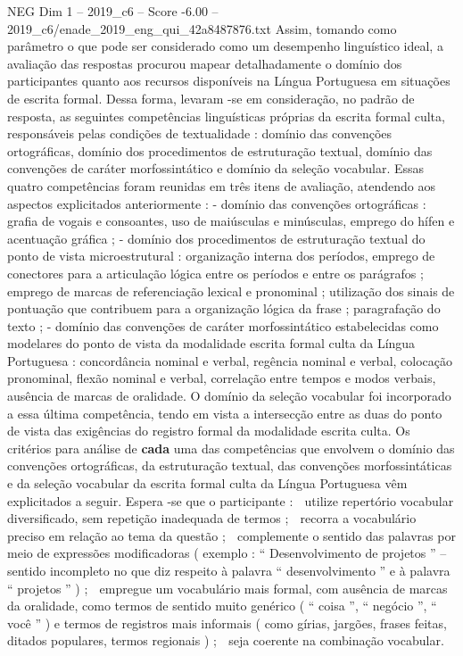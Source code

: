 \begin{textsample}{NEG Dim 1 – 2019\_c6 – Score -6.00 – 2019\_c6/enade\_2019\_eng\_qui\_42a8487876.txt}
Assim, tomando como parâmetro o que pode ser considerado como um desempenho linguístico ideal, a avaliação das respostas procurou mapear detalhadamente o domínio dos participantes quanto aos recursos disponíveis na Língua Portuguesa em situações de escrita formal.
Dessa forma, levaram -se em consideração, no padrão de resposta, as seguintes competências linguísticas próprias da escrita formal culta, responsáveis pelas condições de textualidade : domínio das convenções ortográficas, domínio dos procedimentos de estruturação textual, domínio das convenções de caráter morfossintático e domínio da seleção vocabular.
Essas quatro competências foram reunidas em três itens de avaliação, atendendo aos aspectos explicitados anteriormente : - domínio das convenções ortográficas : grafia de vogais e consoantes, uso de maiúsculas e minúsculas, emprego do hífen e acentuação gráfica ; - domínio dos procedimentos de estruturação textual do ponto de vista microestrutural : organização interna dos períodos, emprego de conectores para a articulação lógica entre os períodos e entre os parágrafos ; emprego de marcas de referenciação lexical e pronominal ; utilização dos sinais de pontuação que contribuem para a organização lógica da frase ; paragrafação do texto ; - domínio das convenções de caráter morfossintático estabelecidas como modelares do ponto de vista da modalidade escrita formal culta da Língua Portuguesa : concordância nominal e verbal, regência nominal e verbal, colocação pronominal, flexão nominal e verbal, correlação entre tempos e modos verbais, ausência de marcas de oralidade.
O domínio da seleção vocabular foi incorporado a essa última competência, tendo em vista a intersecção entre as duas do ponto de vista das exigências do registro formal da modalidade escrita culta.
Os critérios para análise de \textbf{cada} uma das competências que envolvem o domínio das convenções ortográficas, da estruturação textual, das convenções morfossintáticas e da seleção vocabular da escrita formal culta da Língua Portuguesa vêm explicitados a seguir.
Espera -se que o participante :  utilize repertório vocabular diversificado, sem repetição inadequada de termos ;  recorra a vocabulário preciso em relação ao tema da questão ;  complemente o sentido das palavras por meio de expressões modificadoras ( exemplo : “ Desenvolvimento de projetos ” – sentido incompleto no que diz respeito à palavra “ desenvolvimento ” e à palavra “ projetos ” ) ;  empregue um vocabulário mais formal, com ausência de marcas da oralidade, como termos de sentido muito genérico ( “ coisa ”, “ negócio ”, “ você ” ) e termos de registros mais informais ( como gírias, jargões, frases feitas, ditados populares, termos regionais ) ;  seja coerente na combinação vocabular.

\end{textsample}
